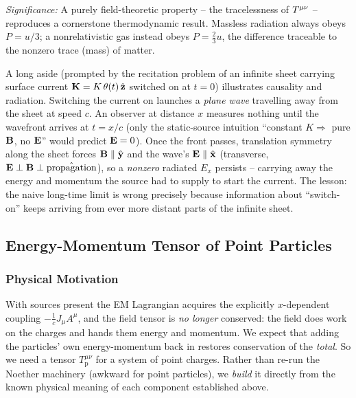 \textit{Significance:} A purely field-theoretic property -- the tracelessness of $T^{\mu\nu}$
-- reproduces a cornerstone thermodynamic result. Massless radiation always obeys $P=u/3$;
a nonrelativistic gas instead obeys $P=\tfrac{2}{3}u$, the difference traceable to the
nonzero trace (mass) of matter.

\begin{remark}
A long aside (prompted by the recitation problem of an infinite sheet carrying surface
current $\mathbf{K}=K\,\theta(t)\,\hat{\mathbf{z}}$ switched on at $t=0$) illustrates causality and
radiation. Switching the current on launches a \emph{plane wave} travelling away from the
sheet at speed $c$. An observer at distance $x$ measures nothing until the wavefront
arrives at $t=x/c$ (only the static-source intuition ``constant $K\Rightarrow$ pure $\mathbf{B}$, no $\mathbf{E}$'' would predict $\mathbf{E}=0$). Once the front passes, translation symmetry along
the sheet forces $\mathbf{B}\parallel\hat{\mathbf{y}}$ and the wave's $\mathbf{E}\parallel\hat{\mathbf{x}}$
(transverse, $\mathbf{E}\perp\mathbf{B}\perp\hat{\mathbf{\text{propagation}}}$), so a \emph{nonzero} radiated
$E_x$ persists -- carrying away the energy and momentum the source had to supply to start
the current. The lesson: the naive long-time limit is wrong precisely because information
about ``switch-on'' keeps arriving from ever more distant parts of the infinite sheet.
\end{remark}

\subsection{Energy-Momentum Tensor of Point Particles}
\label{subsec:lec24:particles}

\subsubsection*{Physical Motivation}
With sources present the EM Lagrangian acquires the explicitly $x$-dependent coupling
$-\tfrac1c J_\mu A^\mu$, and the field tensor is \emph{no longer} conserved: the field does
work on the charges and hands them energy and momentum. We expect that adding the
particles' own energy-momentum back in restores conservation of the \emph{total}. So we
need a tensor $T^{\mu\nu}_{\text{p}}$ for a system of point charges. Rather than re-run the
Noether machinery (awkward for point particles), we \emph{build} it directly from the known
physical meaning of each component established above.

